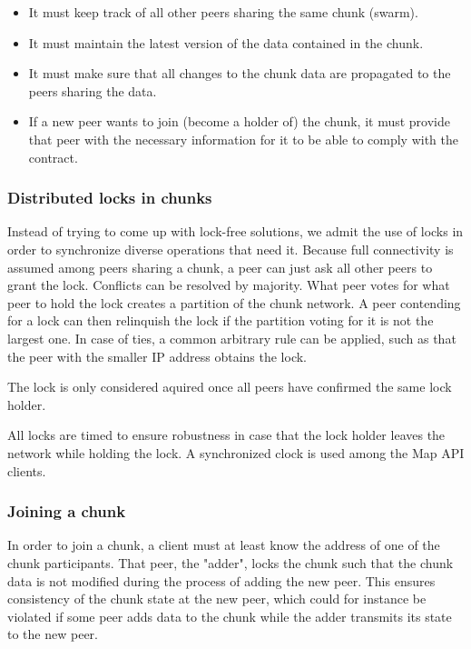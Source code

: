 \documentclass{article}
\begin{document}
\begin{itemize}
  \itemsep0em
  \item It must keep track of all other peers sharing the same chunk (swarm).
  \item It must maintain the latest version of the data contained in the chunk.
  \item It must make sure that all changes to the chunk data are propagated to
    the peers sharing the data.
  \item If a new peer wants to join (become a holder of) the chunk, it must 
    provide that peer with the necessary information for it to be able to comply
    with the contract.
\end{itemize}

\subsubsection{Distributed locks in chunks}

Instead of trying to come up with lock-free solutions, we admit the use of
locks in order to synchronize diverse operations that need it. Because full
connectivity is assumed among peers sharing a chunk, a peer can just ask all
other peers to grant the lock. Conflicts can be resolved by majority. What peer
votes for what peer to hold the lock creates a partition of the chunk network.
A peer contending for a lock can then relinquish the lock if the partition 
voting for it is not the largest one. In case of ties, a common arbitrary rule
can be applied, such as that the peer with the smaller IP address obtains the
lock.

The lock is only considered aquired once all peers have confirmed the same lock
holder.

All locks are timed to ensure robustness in case that the lock holder leaves
the network while holding the lock. A synchronized clock is used among the
Map API clients.

\subsubsection{Joining a chunk}

In order to join a chunk, a client must at least know the address of one of the
chunk participants. That peer, the "adder", locks the chunk such that the chunk
data is not modified during the process of adding the new peer. This ensures
consistency of the chunk state at the new peer, which could for instance be
violated if some peer adds data to the chunk while the adder transmits its state
to the new peer.
\end{document}
